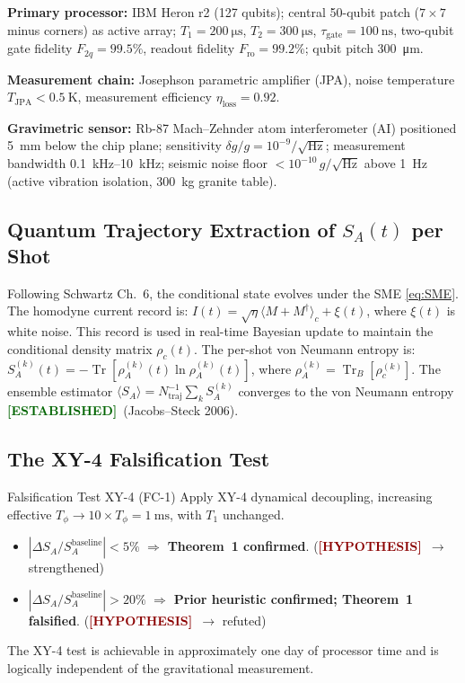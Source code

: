 \documentclass[12pt,a4paper]{article}
\newcommand{\EST}{\textcolor{darkgreen}{\textbf{[ESTABLISHED]}}}
\newcommand{\HYP}{\textcolor{darkred}{\textbf{[HYPOTHESIS]}}}
\theoremstyle{monette}
\theoremstyle{definition}
\newcommand{\SA}{S_A}
\newcommand{\tgate}{\tau_{\mathrm{gate}}}
\newcommand{\Tone}{T_1}
\newcommand{\Tphi}{T_\phi}
\renewcommand{\Tr}{\operatorname{Tr}}
\begin{document}
\textbf{Primary processor:} IBM Heron r2 (127 qubits);
central 50-qubit patch ($7\times7$ minus corners) as active array;
$\Tone = \SI{200}{\micro\second}$, $T_2 = \SI{300}{\micro\second}$,
$\tgate = \SI{100}{\nano\second}$,
two-qubit gate fidelity $F_{2q} = 99.5\%$,
readout fidelity $F_{\mathrm{ro}} = 99.2\%$;
qubit pitch \SI{300}{\micro\metre}.

\textbf{Measurement chain:} Josephson parametric amplifier (JPA),
noise temperature $T_{\mathrm{JPA}} < \SI{0.5}{\kelvin}$,
measurement efficiency $\eta_{\mathrm{loss}} = 0.92$.

\textbf{Gravimetric sensor:} Rb-87 Mach--Zehnder atom interferometer
(AI) positioned \SI{5}{\milli\metre} below the chip plane;
sensitivity $\delta g/g = 10^{-9}/\sqrt{\mathrm{Hz}}$;
measurement bandwidth \SIrange{0.1}{10}{\kilo\hertz};
seismic noise floor $< 10^{-10}\,g/\sqrt{\mathrm{Hz}}$ above \SI{1}{\hertz}
(active vibration isolation, \SI{300}{\kilo\gram} granite table).

\subsection{Quantum Trajectory Extraction of \texorpdfstring{$S_A(t)$}{S\_A(t)} per Shot}
\label{sec:trajectories}

Following Schwartz \cite{Schwartz2016} Ch.~6, the conditional state evolves
under the SME \cref{eq:SME}. The homodyne current record is:
$I(t) = \sqrt{\eta}\langle M + M^\dagger\rangle_c + \xi(t)$,
where $\xi(t)$ is white noise. This record is used in real-time Bayesian
update to maintain the conditional density matrix $\rho_c(t)$.
The per-shot von Neumann entropy is:
$\SA^{(k)}(t) = -\Tr[\rho_A^{(k)}(t)\ln\rho_A^{(k)}(t)]$,
where $\rho_A^{(k)} = \Tr_B[\rho_c^{(k)}]$.
The ensemble estimator
$\langle\SA\rangle = N_{\mathrm{traj}}^{-1}\sum_k \SA^{(k)}$
converges to the von Neumann entropy \EST\ (Jacobs--Steck 2006).

\subsection{The XY-4 Falsification Test}
\label{sec:XY4}

\begin{predbox}{Falsification Test XY-4 (FC-1)}
Apply XY-4 dynamical decoupling, increasing effective $\Tphi \to 10\times\Tphi
= \SI{1}{\milli\second}$, with $\Tone$ unchanged.
\begin{itemize}[nosep]
  \item $|\Delta\SA/\SA^{\mathrm{baseline}}| < 5\%$ \quad
        $\Rightarrow$ \textbf{Theorem~1 confirmed}.
        \hfill (\HYP\ $\to$ strengthened)
  \item $|\Delta\SA/\SA^{\mathrm{baseline}}| > 20\%$ \quad
        $\Rightarrow$ \textbf{Prior heuristic confirmed; Theorem~1 falsified}.
        \hfill (\HYP\ $\to$ refuted)
\end{itemize}
The XY-4 test is achievable in approximately one day of processor time
and is logically independent of the gravitational measurement.
\end{predbox}
\end{document}
